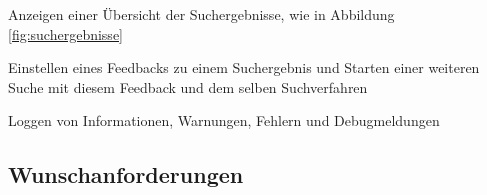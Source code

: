 \begin{description}
	\newline
	\item[\req{F 260}] Anzeigen einer \"Ubersicht der Suchergebnisse, wie in Abbildung \ref{fig:suchergebnisse}
	\item[\req{F 290}] Einstellen eines Feedbacks zu einem Suchergebnis und Starten einer weiteren Suche mit diesem Feedback und dem selben Suchverfahren
	
	\item[\req{F 320}] Loggen von Informationen, Warnungen, Fehlern und Debugmeldungen
	 
\end{description}

\subsection{Wunschanforderungen}
